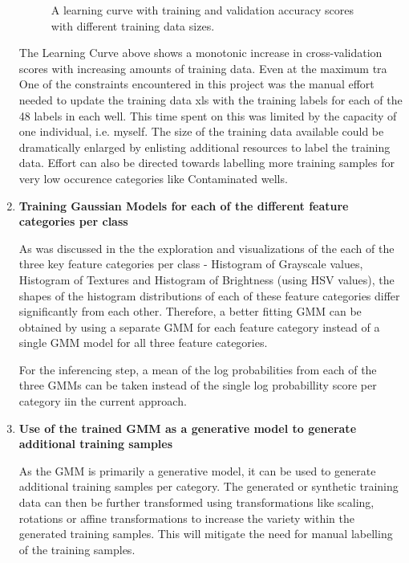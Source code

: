 \documentclass[a4paper,twoside,12pt]{report}
\begin{document}
\begin{enumerate}
\begin{figure} [!htbp]
\centering
\caption[Learning Curve for Random Forest classifier] {A learning curve with training and validation accuracy scores with different training data sizes.     }
\end{figure}

The Learning Curve above shows a monotonic increase in cross-validation scores with increasing amounts of training data.   Even at the maximum tra
One of the constraints encountered in this project was the manual effort needed to update the training data xls with the training labels for each of the 48 labels in each well.     This time spent on this was limited by the capacity of one individual, i.e. myself.   The size of the training data available could be dramatically enlarged by enlisting additional resources to label the training data.    Effort can also be directed towards labelling more training samples for very low occurence categories like Contaminated wells. 

\item \textbf{Training Gaussian Models for each of the different feature categories per class}

As was discussed in the the exploration and visualizations of the each of the three key feature categories per class - Histogram of Grayscale values,  Histogram of Textures and Histogram of Brightness (using HSV values), the shapes of the histogram distributions of each of these feature categories differ significantly from each other.     Therefore, a better fitting GMM can be obtained by using a separate GMM for each feature category instead of a single GMM model for all three feature categories.     

For the inferencing step, a mean of the log probabilities from each of the three GMMs can be taken instead of the single log probabillity score per category iin the current approach.   

\item \textbf{Use of the trained GMM as a generative model to generate additional training samples}

As the GMM is primarily a generative model, it can be used to generate additional training samples per category.    The generated or synthetic training data can then be further transformed using transformations like scaling, rotations or affine transformations to increase the variety within the generated training samples.     This will mitigate the need for manual labelling of the training samples.  


\end{enumerate}
\end{document}
